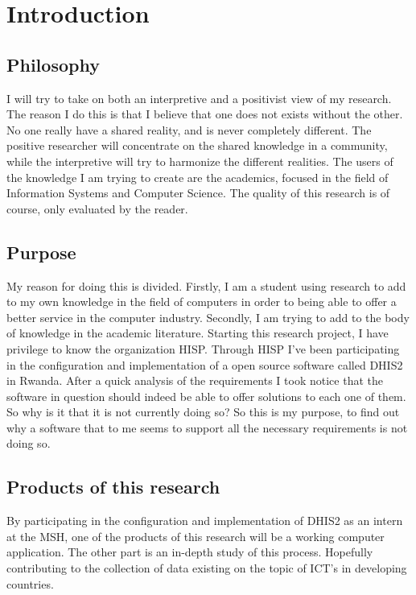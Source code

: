 \chapter{Introduction}

\section{Philosophy}
I will try to take on both an interpretive and a positivist view of my research.
The reason I do this is that I believe that one does not exists without the other.
No one really have a shared reality, and is never completely different.
The positive researcher will concentrate on the shared knowledge in a community, while the interpretive will try to harmonize the different realities. The users of the knowledge I am trying to create are the academics, focused in the field of Information Systems and Computer Science. The quality of this research is of course, only evaluated by the reader.

\section{Purpose}
My reason for doing this is divided. 
Firstly, I am a student using research to add to my own knowledge in the field of computers in order to being able to offer a better service in the computer industry.
Secondly, I am trying to add to the body of knowledge in the academic literature.
Starting this research project, I have privilege to know the organization HISP. 
Through HISP I've been participating in the configuration and implementation of a open source software called DHIS2 in Rwanda. After a quick analysis of the requirements I took notice that the software in question should indeed be able to offer solutions to each one of them. So why is it that it is not currently doing so? 
So this is my purpose, to find out why a software that to me seems to support all the necessary requirements is not doing so.

\section{Products of this research}
By participating in the configuration and implementation of DHIS2 as an intern at the MSH, one of the products of this research will be a working computer application. The other part is an in-depth study of this process. Hopefully contributing to the collection of data existing on the topic of ICT's in developing countries.





